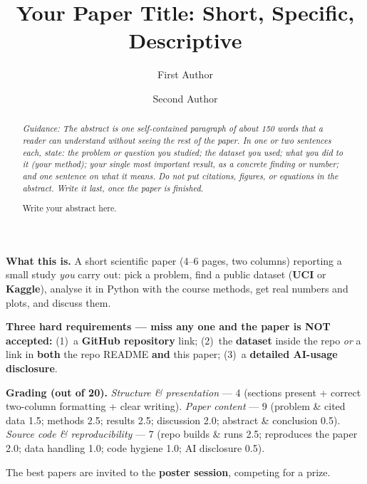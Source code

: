 \documentclass[sigconf,nonacm]{acmart}
\newcommand{\guidance}[1]{\par{\small\color{guide}\textit{Guidance: #1}}\par\medskip}
\begin{document}
\begin{tcolorbox}[colback=yellow!8,colframe=orange!60!black,title=\textbf{READ FIRST --- then delete this box before submitting}]
\small
\textbf{What this is.} A short scientific paper (4--6 pages, two columns)
reporting a small study \emph{you} carry out: pick a problem, find a public
dataset (\textbf{UCI} or \textbf{Kaggle}), analyse it in Python with the course
methods, get real numbers and plots, and discuss them.

\smallskip
\textbf{Three hard requirements --- miss any one and the paper is NOT accepted:}
(1)~a \textbf{GitHub repository} link; (2)~the \textbf{dataset} inside the repo
\emph{or} a link in \textbf{both} the repo README \textbf{and} this paper;
(3)~a \textbf{detailed AI-usage disclosure}.

\smallskip
\textbf{Grading (out of 20).}
\textit{Structure \& presentation} --- 4
(sections present + correct two-column formatting + clear writing).
\textit{Paper content} --- 9
(problem \& cited data 1.5; methods 2.5; results 2.5; discussion 2.0;
abstract \& conclusion 0.5).
\textit{Source code \& reproducibility} --- 7
(repo builds \& runs 2.5; reproduces the paper 2.0; data handling 1.0;
code hygiene 1.0; AI disclosure 0.5).

\smallskip
The best papers are invited to the \textbf{poster session}, competing for a prize.
\end{tcolorbox}

\title{Your Paper Title: Short, Specific, Descriptive}

\author{First Author}

\author{Second Author}

\begin{abstract}
\guidance{The abstract is one self-contained paragraph of about 150 words that
a reader can understand without seeing the rest of the paper. In one or two
sentences each, state: the problem or question you studied; the dataset you
used; what you did to it (your method); your single most important result, as a
concrete finding or number; and one sentence on what it means. Do not put
citations, figures, or equations in the abstract. Write it last, once the paper
is finished.}
Write your abstract here.
\end{abstract}
\end{document}
